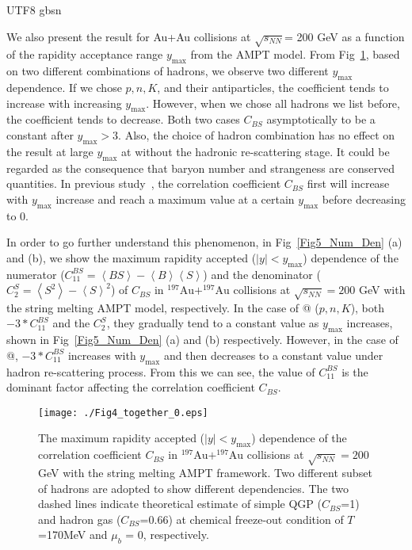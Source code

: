 \documentclass[twocolumn,showpacs,preprintnumbers,superscriptaddress,amsmath,amssymb]{revtex4}
\makeatletter
\newcommand{\Rmnum}[1]{\expandafter\@slowromancap\romannumeral #1@}
\makeatother
\begin{document}
\begin{CJK*} {UTF8} {gbsn}
	


\par

We also present the result for Au+Au collisions at $\sqrt{s_{NN}}$= 200 GeV as a function of the rapidity acceptance range $y_{\text{max}}$ from the AMPT model.
	From Fig~\ref{Fig4_ymax}, based on two different combinations of hadrons, we observe two different $y_{\text{max}}$ dependence.
	If we chose $p, n, K$, and their antiparticles, the coefficient tends to increase with increasing $y_{\text{max}}$.
	However, when we chose all hadrons we list before, the coefficient tends to decrease.
	Both two cases $C_{BS}$ asymptotically to be a constant after $y_{\text{max}}>3$.
	Also, the choice of hadron combination has no effect on the result at large $y_{\text{max}}$ at without the hadronic re-scattering stage.
	It could be regarded as the consequence that baryon number and strangeness are conserved quantities. In previous study~\cite{Koch_origin}, the correlation coefficient $C_{BS}$ first will increase with $y_{\text{max}}$ increase 
	and reach a maximum value at a certain $y_{\text{max}}$ before decreasing to 0.
	

	In order to go further understand this phenomenon, in Fig~\ref{Fig5_Num_Den} (a) and (b), we show the maximum rapidity accepted ($|y|<y_{\text{max}}$) dependence of the numerator ($C_{11}^{BS}= \left\langle BS \right\rangle - \left\langle B \right\rangle \left\langle S \right\rangle$) and the denominator ($C_{2}^{S}= \left\langle  S^{2} \right\rangle -\left\langle S \right\rangle^{2}$) of $C_{BS}$ in $\mathrm{^{197}Au+^{197}Au}$ collisions at $\sqrt{s_{NN}} = 200$ GeV with the string melting AMPT model, respectively. In the case of \Rmnum{2} ($p, n, K$), both $-3*C_{11}^{BS}$ and the $C_{2}^{S}$, they gradually tend to a constant value as $y_{\text{max}}$ increases, shown in Fig~\ref{Fig5_Num_Den} (a) and (b) respectively. However, in the case of \Rmnum{1}, $-3*C_{11}^{BS}$ increases with $y_{\text{max}}$ and then decreases to a constant value under hadron re-scattering process. From this we can see, the value of $C_{11}^{BS}$ is the dominant factor affecting the correlation coefficient $C_{BS}$.
			
	\begin{figure}[htb]
				\texttt{[image: ./Fig4\_together\_0.eps]}
				\caption{
				The maximum rapidity accepted ($|y|<y_{\text{max}}$) dependence of the correlation coefficient $C_{BS}$
				in $\mathrm{^{197}Au+^{197}Au}$ collisions at $\sqrt{s_{NN}} = 200$ GeV with the string melting AMPT framework.
				Two different subset of hadrons are adopted to show different dependencies.
				The two dashed lines indicate theoretical estimate of simple QGP ($C_{BS}$=1) and hadron gas ($C_{BS}$=0.66) at chemical freeze-out condition of $T$ =170MeV and $\mu_{b}$ = 0, respectively.  }
				\label{Fig4_ymax}
	\end{figure}
	

\end{CJK*}
\end{document}
